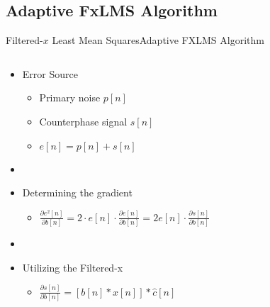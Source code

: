 \subsection{Adaptive FxLMS Algorithm}
\begin{frame}{Filtered-$x$ Least Mean Squares}{Adaptive FXLMS Algorithm}

	\begin{columns}
		\begin{column}{0.5\textwidth}
		\begin{center}
		

		\begin{itemize}
		\item Error Source
		\begin{itemize}
		\item Primary noise $p[n]$
		\item Counterphase signal $s[n]$
		\item $e[n]=p[n]+s[n]$
		\end{itemize}
		\item[]
		\item Determining the gradient
		\begin{itemize}
		\item[] $\frac{\partial e^2[n]}{\partial b[n]}=2 \cdot e[n] \cdot \frac{\partial e[n]}{\partial b[n]} =2e[n] \cdot \frac{\partial s[n]}{\partial b[n]}$
		\end{itemize}
		\item[]
		\item Utilizing the Filtered-x
		\begin{itemize}
		\item[] $\frac{\partial s[n]}{\partial b[n]} = [b[n] * x[n]]* \hat{c}[n]$
		\end{itemize}			
		\end{itemize}
		\end{center}	
		
		
		
		
		\end{column}
		\begin{column}{0.5\textwidth}	
		\resizebox{1.1\columnwidth}{!}{	
			
		}
		\end{column}
	\end{columns}


\end{frame}


